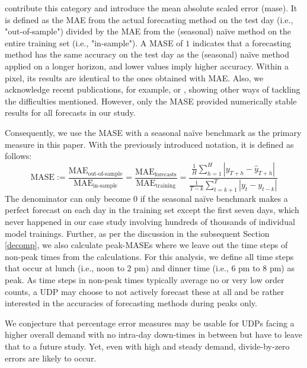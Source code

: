 \begin{enumerate}
\cite{hyndman2006} contribute this category and introduce the mean absolute
    scaled error (\gls{mase}).
It is defined as the MAE from the actual forecasting method on the test day
    (i.e., "out-of-sample") divided by the MAE from the (seasonal) na\"{i}ve
    method on the entire training set (i.e., "in-sample").
A MASE of $1$ indicates that a forecasting method has the same accuracy
    on the test day as the (seasonal) na\"{i}ve method applied on a longer
    horizon, and lower values imply higher accuracy.
Within a pixel, its results are identical to the ones obtained with MAE.
Also, we acknowledge recent publications, for example, \cite{prestwich2014} or
    \cite{kim2016}, showing other ways of tackling the difficulties mentioned.
However, only the MASE provided numerically stable results for all
    forecasts in our study.
\end{enumerate}
Consequently, we use the MASE with a seasonal na\"{i}ve benchmark as the
    primary measure in this paper.
With the previously introduced notation, it is defined as follows:
$$
\text{MASE}
:=
\frac{\text{MAE}_{\text{out-of-sample}}}{\text{MAE}_{\text{in-sample}}}
=
\frac{\text{MAE}_{\text{forecasts}}}{\text{MAE}_{\text{training}}}
=
\frac{\frac{1}{H} \sum_{h=1}^H |y_{T+h} - \hat{y}_{T+h}|}
     {\frac{1}{T-k} \sum_{t=k+1}^T |y_{t} - y_{t-k}|}
$$
The denominator can only become $0$ if the seasonal na\"{i}ve benchmark makes
    a perfect forecast on each day in the training set except the first seven
    days, which never happened in our case study involving hundreds of
    thousands of individual model trainings.
Further, as per the discussion in the subsequent Section \ref{decomp}, we also
    calculate peak-MASEs where we leave out the time steps of non-peak times
    from the calculations.
For this analysis, we define all time steps that occur at lunch (i.e., noon to
    2 pm) and dinner time (i.e., 6 pm to 8 pm) as peak.
As time steps in non-peak times typically average no or very low order counts,
    a UDP may choose to not actively forecast these at all and be rather
    interested in the accuracies of forecasting methods during peaks only.

We conjecture that percentage error measures may be usable for UDPs facing a
    higher overall demand with no intra-day down-times in between but have to
    leave that to a future study.
Yet, even with high and steady demand, divide-by-zero errors are likely to
    occur.